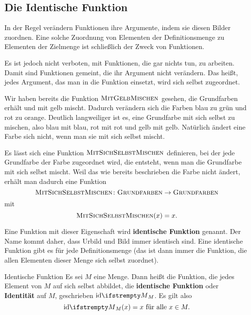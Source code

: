 \documentclass[../../main.tex]{subfiles}
\begin{document}
\subsection{Die Identische Funktion}
\label{sec:abbildungen_identitaet}

In der Regel verändern Funktionen ihre Argumente, indem sie diesen Bilder zuordnen. Eine solche Zuordnung von Elementen der Definitionsmenge zu Elementen der Zielmenge ist schließlich der Zweck von Funktionen. 

Es ist jedoch nicht verboten, mit Funktionen, die gar nichts tun, zu arbeiten. Damit sind Funktionen gemeint, die ihr Argument nicht verändern. Das heißt, jedes Argument, das man in die Funktion einsetzt, wird sich selbst zugeordnet.

\begin{example}{}
    \parpic[r]{}
    Wir haben bereits die Funktion $\textsc{MitGelbMischen}$ gesehen, die Grundfarben erhält und mit gelb mischt. Dadurch verändern sich die Farben blau zu grün und rot zu orange. Deutlich langweiliger ist es, eine Grundfarbe mit sich selbst zu mischen, also blau mit blau, rot mit rot und gelb mit gelb. Natürlich ändert eine Farbe sich nicht, wenn man sie mit sich selbst mischt.
    
    Es lässt sich eine Funktion $\textsc{MitSichSelbstMischen}$ definieren, bei der jede Grundfarbe der Farbe zugeordnet wird, die entsteht, wenn man die Grundfarbe mit sich selbst mischt. Weil das wie bereits beschrieben die Farbe nicht ändert, erhält man dadurch eine Funktion
    \[\textsc{MitSichSelbstMischen}\colon\textsc{Grundfarben}\rightarrow\textsc{Grundfarben}\]
    mit
    \[\textsc{MitSichSelbstMischen}(x)=x.\]
\end{example}

Eine Funktion mit dieser Eigenschaft wird \textbf{identische Funktion} genannt. Der Name kommt daher, dass Urbild und Bild immer identisch sind. Eine identische Funktion gibt es für jede Definitionsmenge (das ist dann immer die Funktion, die allen Elementen dieser Menge sich selbst zuordnet).

\begin{definition}{Identische Funktion}
    Es sei $M$ eine Menge. Dann heißt die Funktion, die jedes Element von $M$ auf sich selbst abbildet, die \textbf{identische Funktion} oder \textbf{Identität} auf $M$, geschrieben $\ident[M]$. Es gilt also \[\ident[M](x)=x\text{~für alle~}x\in M.\]
\end{definition}
\end{document}
